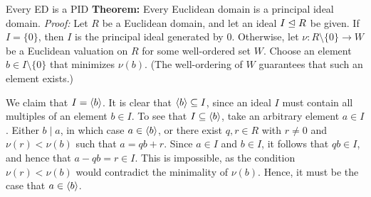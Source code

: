 \begin{thmbox}{Every ED is a PID}
	\textbf{Theorem:} Every Euclidean domain is a principal ideal domain.
\tcblower
	\textit{Proof:} Let $R$ be a Euclidean domain, and let an ideal $I \trianglelefteq R$ be given. If $I = \{0\}$, then $I$ is the principal ideal generated by $0$. Otherwise, let $\nu: R \setminus \{0\} \to W$ be a Euclidean valuation on $R$ for some well-ordered set $W$. Choose an element $b \in I \setminus \{0\}$ that minimizes $\nu(b)$. (The well-ordering of $W$ guarantees that such an element exists.)

	We claim that $I = {\langle {b} \rangle}$. It is clear that ${\langle {b} \rangle} \subseteq I$, since an ideal $I$ must contain all multiples of an element $b \in I$. To see that $I \subseteq {\langle {b} \rangle}$, take an arbitrary element $a \in I$. Either $b \mid a$, in which case $a \in {\langle {b} \rangle}$, or there exist $q, r \in R$ with $r \ne 0$ and $\nu(r) < \nu(b)$ such that $a = qb + r$. Since $a \in I$ and $b \in I$, it follows that $qb \in I$, and hence that $a - qb = r \in I$. This is impossible, as the condition $\nu(r) < \nu(b)$ would contradict the minimality of $\nu(b)$. Hence, it must be the case that $a \in {\langle {b} \rangle}$.
\end{thmbox}
